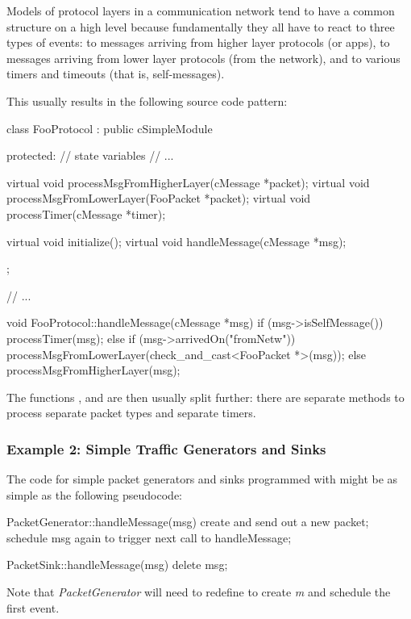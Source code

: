 Models of protocol layers in a communication network tend to have
a common structure on a high level because fundamentally they all have to react
to three types of events: to messages arriving from higher layer protocols
(or apps), to messages arriving from lower layer protocols (from the network),
and to various timers and timeouts (that is, self-messages).

This usually results in the following source code pattern:

\begin{cpp}
class FooProtocol : public cSimpleModule
{
  protected:
    // state variables
    // ...

    virtual void processMsgFromHigherLayer(cMessage *packet);
    virtual void processMsgFromLowerLayer(FooPacket *packet);
    virtual void processTimer(cMessage *timer);

    virtual void initialize();
    virtual void handleMessage(cMessage *msg);
};

// ...

void FooProtocol::handleMessage(cMessage *msg)
{
    if (msg->isSelfMessage())
        processTimer(msg);
    else if (msg->arrivedOn("fromNetw"))
        processMsgFromLowerLayer(check_and_cast<FooPacket *>(msg));
    else
        processMsgFromHigherLayer(msg);
}
\end{cpp}

The functions , 
and  are then usually split further: there are separate
methods to process separate packet types and separate timers.


\subsubsection{Example 2: Simple Traffic Generators and Sinks}
\label{sec:simple-modules:handlemessage:traffic-generator-example}


The code for simple packet generators and sinks programmed with  might
be as simple as the following pseudocode:

\begin{cpp}
PacketGenerator::handleMessage(msg)
{
    create and send out a new packet;
    schedule msg again to trigger next call to handleMessage;
}

PacketSink::handleMessage(msg)
{
    delete msg;
}
\end{cpp}

Note that \textit{PacketGenerator} will need to redefine 
to create \textit{m} and schedule the first event.

